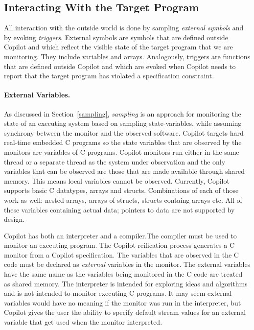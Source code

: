 \subsection{Interacting With the Target Program}
\label{subsec:interacting}

All interaction with the outside world is done by sampling \emph{external
  symbols} and by evoking \emph{triggers}.  External symbols are symbols that
are defined outside Copilot and which reflect the visible state of the target
program that we are monitoring.  They include variables and arrays.
Analogously, triggers are functions that are defined outside Copilot and which
are evoked when Copilot needs to report that the target program has violated a
specification constraint.

\paragraph{External Variables.}


As discussed in Section~\ref{sampling}, \emph{sampling} is an approach
for monitoring the state of an executing system based on sampling
state-variables, while assuming synchrony between the monitor and the
observed software. Copilot targets hard real-time embedded C programs
so the state variables that are observed by the monitors are variables
of C programs. Copilot monitors run either in the same thread or a
separate thread as the system under observation and the only variables
that can be observed are those that are made available through shared
memory. This means local variables cannot be observed. Currently,
Copilot supports basic C datatypes, arrays and structs. Combinations of each of
those work as well: nested arrays, arrays of structs, structs containg arrays
etc. All of these variables containing actual data; pointers to data are not
supported by design.


Copilot has both an interpreter and a compiler.The compiler must be
used to monitor an executing program. The Copilot reification process
generates a C monitor from a Copilot specification. The variables that
are observed in the C code must be declared as \emph{external}
variables in the monitor. The external variables have the same name as
the variables being monitored in the C code are treated as shared
memory. The interpreter is intended for exploring ideas and algorithms
and is not intended to monitor executing  C
programs. It may seem external variables would have no meaning if the
monitor was run in the interpreter, but Copilot gives the user the
ability to specify default stream values for an external variable that
get used when the monitor interpreted.

